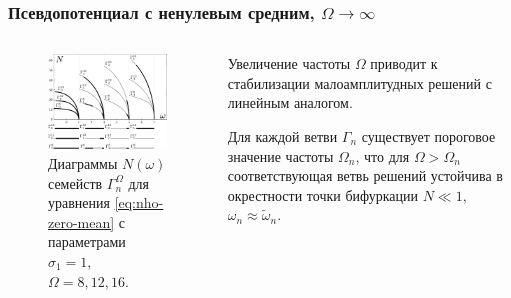 \documentclass [10pt] {beamer}
\begin{document}
\begin{frame}
	\frametitle{Псевдопотенциал с ненулевым средним, $\Omega \to \infty$}
	
	\begin{columns}
		\begin{column}{.5\textwidth}
			\begin{figure}[h]
			\includegraphics[width = 1\textwidth]{pic/branches with linear counterpart, zero mean cosine nho}
			\caption{
			Диаграммы $N(\omega)$ семейств $\Gamma_n^{\Omega}$ для уравнения \eqref{eq:nho-zero-mean} с параметрами $\sigma_1 = 1$, $\Omega = 8, 12, 16$.
			}
			\end{figure}
		\end{column}
		\begin{column}{.5\textwidth}
			Увеличение частоты $\Omega$ приводит к стабилизации малоамплитудных решений с линейным аналогом.
			
			\vspace{15pt}
			
			Для каждой ветви $\Gamma_n$ существует пороговое значение частоты $\Omega_n$, что для $\Omega > \Omega_n$ соответствующая ветвь решений устойчива в окрестности точки бифуркации $N \ll 1$, $\omega_n \approx \tilde{\omega}_n$.
		\end{column}
	\end{columns}
\end{frame}
\end{document}
